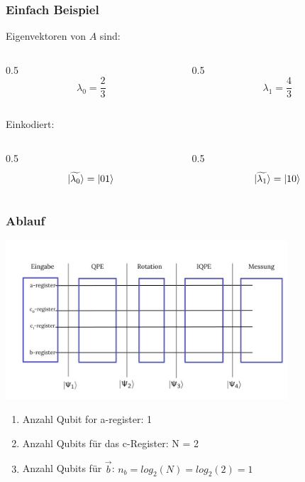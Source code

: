 \begin{frame}
    \frametitle{Einfach Beispiel}

    Eigenvektoren von $A$ sind:    
    \begin{columns}[c]
        \begin{column}{0.5\hsize}\centering
            $$\lambda_0 = \frac{2}{3}$$
        \end{column}

        \begin{column}{0.5\hsize}
            $$\lambda_1 = \frac{4}{3}$$
        \end{column}
    \end{columns}

    \hfil

    \hfil

    Einkodiert:
    \begin{columns}[c]
        \begin{column}{0.5\hsize}\centering
            $$\ket{\widetilde{\lambda_0}} = \ket{01}$$
        \end{column}

        \begin{column}{0.5\hsize}
            $$\ket{\widetilde{\lambda_1}} = \ket{10}$$
        \end{column}
    \end{columns}
\end{frame}



\begin{frame}
    \frametitle{Ablauf}

    \begin{center}
    \includegraphics[width=10.5cm]{img/example_circuit/example_circuit.jpg}
    \end{center}

    \begin{enumerate}
        \item Anzahl Qubit for a-register: 1
        \item Anzahl Qubits für das c-Register: N = 2
        \item Anzahl Qubits für $\vec{b}$: $n_b = log_2(N) = log_2 (2) = 1$ 
    \end{enumerate}
\end{frame}

